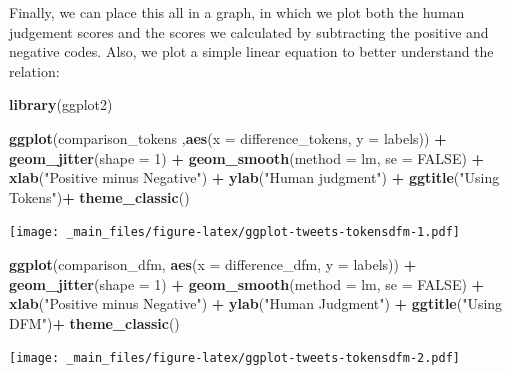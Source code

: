 \documentclass[
]{book}
\newenvironment{Shaded}{\begin{snugshade}}{\end{snugshade}}
\newcommand{\AttributeTok}[1]{\textcolor[rgb]{0.13,0.29,0.53}{#1}}
\newcommand{\ConstantTok}[1]{\textcolor[rgb]{0.56,0.35,0.01}{#1}}
\newcommand{\DecValTok}[1]{\textcolor[rgb]{0.00,0.00,0.81}{#1}}
\newcommand{\FunctionTok}[1]{\textcolor[rgb]{0.13,0.29,0.53}{\textbf{#1}}}
\newcommand{\NormalTok}[1]{#1}
\newcommand{\SpecialCharTok}[1]{\textcolor[rgb]{0.81,0.36,0.00}{\textbf{#1}}}
\newcommand{\StringTok}[1]{\textcolor[rgb]{0.31,0.60,0.02}{#1}}
\begin{document}
Finally, we can place this all in a graph, in which we plot both the human judgement scores and the scores we calculated by subtracting the positive and negative codes. Also, we plot a simple linear equation to better understand the relation:

\begin{Shaded}
\begin{Highlighting}[]
\FunctionTok{library}\NormalTok{(ggplot2)}

\FunctionTok{ggplot}\NormalTok{(comparison\_tokens ,}\FunctionTok{aes}\NormalTok{(}\AttributeTok{x =}\NormalTok{ difference\_tokens, }\AttributeTok{y =}\NormalTok{ labels)) }\SpecialCharTok{+}
 \FunctionTok{geom\_jitter}\NormalTok{(}\AttributeTok{shape =} \DecValTok{1}\NormalTok{) }\SpecialCharTok{+}
 \FunctionTok{geom\_smooth}\NormalTok{(}\AttributeTok{method =}\NormalTok{ lm, }\AttributeTok{se =} \ConstantTok{FALSE}\NormalTok{) }\SpecialCharTok{+}
 \FunctionTok{xlab}\NormalTok{(}\StringTok{"Positive minus Negative"}\NormalTok{) }\SpecialCharTok{+}
 \FunctionTok{ylab}\NormalTok{(}\StringTok{"Human judgment"}\NormalTok{) }\SpecialCharTok{+}
 \FunctionTok{ggtitle}\NormalTok{(}\StringTok{"Using Tokens"}\NormalTok{)}\SpecialCharTok{+}
 \FunctionTok{theme\_classic}\NormalTok{()}
\end{Highlighting}
\end{Shaded}

\texttt{[image: \_main\_files/figure-latex/ggplot-tweets-tokensdfm-1.pdf]}

\begin{Shaded}
\begin{Highlighting}[]
\FunctionTok{ggplot}\NormalTok{(comparison\_dfm, }\FunctionTok{aes}\NormalTok{(}\AttributeTok{x =}\NormalTok{ difference\_dfm, }\AttributeTok{y =}\NormalTok{ labels)) }\SpecialCharTok{+}
 \FunctionTok{geom\_jitter}\NormalTok{(}\AttributeTok{shape =} \DecValTok{1}\NormalTok{) }\SpecialCharTok{+}
 \FunctionTok{geom\_smooth}\NormalTok{(}\AttributeTok{method =}\NormalTok{ lm, }\AttributeTok{se =} \ConstantTok{FALSE}\NormalTok{) }\SpecialCharTok{+}
 \FunctionTok{xlab}\NormalTok{(}\StringTok{"Positive minus Negative"}\NormalTok{) }\SpecialCharTok{+}
 \FunctionTok{ylab}\NormalTok{(}\StringTok{"Human Judgment"}\NormalTok{) }\SpecialCharTok{+}
 \FunctionTok{ggtitle}\NormalTok{(}\StringTok{"Using DFM"}\NormalTok{)}\SpecialCharTok{+}
 \FunctionTok{theme\_classic}\NormalTok{()}
\end{Highlighting}
\end{Shaded}

\texttt{[image: \_main\_files/figure-latex/ggplot-tweets-tokensdfm-2.pdf]}
\end{document}
